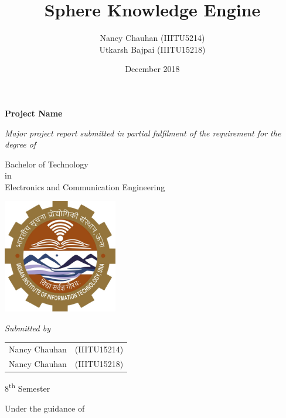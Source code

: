 \documentclass[a4paper,12 pt,oneside]{book}
\title{Sphere Knowledge Engine}
\author{Nancy Chauhan (IIITU5214)\\
Utkarsh Bajpai (IIITU15218)\\
}
\date{December 2018}
\begin{document}
\frontmatter
\pagestyle{plain}

\begin{titlepage}
    \begin{center}

        \Huge{\textbf{Project Name }}
 
        \vspace{0.5cm}
        
        \normalsize
        \textit{
        Major project report submitted in partial fulfilment of the requirement for the degree of}
        
        \vspace{10pt}
        
        Bachelor of Technology\\
        in\\
        Electronics and Communication Engineering
        
         \vspace{1 cm}
        \includegraphics[height=5cm]{images/iiituna.jpg}
        
          \vspace{1 cm}
        \textit{Submitted by}
        
        \vspace{5pt}
        
        \begin{tabular}{c c}
            Nancy Chauhan & (IIITU15214)\\
            Nancy Chauhan & (IIITU15218)\\
        \end{tabular}
 
        \vspace{5pt}
        8\textsuperscript{th} Semester
 
        \vspace{1cm}
 
        Under the guidance of
        
        \vspace{5pt}
        

\end{center}
\end{titlepage}
\end{document}
